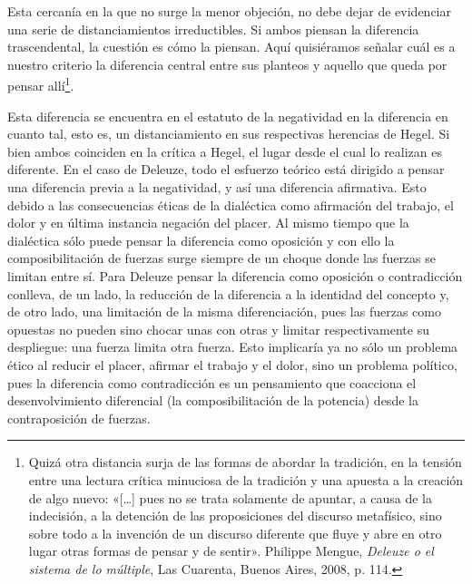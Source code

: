 Esta cercanía en la que no surge la menor objeción, no debe dejar de evidenciar una serie de distanciamientos irreductibles. Si ambos piensan la diferencia trascendental, la cuestión es cómo la piensan. Aquí quisiéramos señalar cuál es a nuestro criterio la diferencia central entre sus planteos y aquello que queda por pensar allí\footnote{Quizá otra distancia surja de las formas de abordar la tradición, en la tensión entre una lectura crítica minuciosa de la tradición y una apuesta a la creación de algo nuevo: «{[}\ldots{]} pues no se trata solamente de apuntar, a causa de la indecisión, a la detención de las proposiciones del discurso metafísico, sino sobre todo a la invención de un discurso diferente que fluye y abre en otro lugar otras formas de pensar y de sentir». Philippe Mengue, \emph{Deleuze o el sistema de lo múltiple}, Las Cuarenta, Buenos Aires, 2008, p. 114.}.

Esta diferencia se encuentra en el estatuto de la negatividad en la diferencia en cuanto tal, esto es, un distanciamiento en sus respectivas herencias de Hegel. Si bien ambos coinciden en la crítica a Hegel, el lugar desde el cual lo realizan es diferente. En el caso de Deleuze, todo el esfuerzo teórico está dirigido a pensar una diferencia previa a la negatividad, y así una diferencia afirmativa. Esto debido a las consecuencias éticas de la dialéctica como afirmación del trabajo, el dolor y en última instancia negación del placer. Al mismo tiempo que la dialéctica sólo puede pensar la diferencia como oposición y con ello la composibilitación de fuerzas surge siempre de un choque donde las fuerzas se limitan entre sí. Para Deleuze pensar la diferencia como oposición o contradicción conlleva, de un lado, la reducción de la diferencia a la identidad del concepto y, de otro lado, una limitación de la misma diferenciación, pues las fuerzas como opuestas no pueden sino chocar unas con otras y limitar respectivamente su despliegue: una fuerza limita otra fuerza. Esto implicaría ya no sólo un problema ético al reducir el placer, afirmar el trabajo y el dolor, sino un problema político, pues la diferencia como contradicción es un pensamiento que coacciona el desenvolvimiento diferencial (la composibilitación de la potencia) desde la contraposición de fuerzas.

